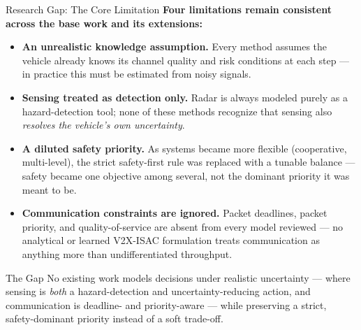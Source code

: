 \documentclass[aspectratio=169]{beamer}
\begin{document}
\begin{frame}{Research Gap: The Core Limitation}
  \footnotesize
  \textbf{Four limitations remain consistent across the base work and its extensions:}

  \begin{itemize}
    \setlength{\itemsep}{0pt}
    \item \textbf{An unrealistic knowledge assumption.} Every method assumes the vehicle already knows its channel quality and risk conditions at each step --- in practice this must be estimated from noisy signals.
    \item \textbf{Sensing treated as detection only.} Radar is always modeled purely as a hazard-detection tool; none of these methods recognize that sensing also \emph{resolves the vehicle's own uncertainty}.
    \item \textbf{A diluted safety priority.} As systems became more flexible (cooperative, multi-level), the strict safety-first rule was replaced with a tunable balance --- safety became one objective among several, not the dominant priority it was meant to be.
    \item \textbf{Communication constraints are ignored.} Packet deadlines, packet priority, and quality-of-service are absent from every model reviewed --- no analytical or learned V2X-ISAC formulation treats communication as anything more than undifferentiated throughput.
  \end{itemize}

  \scriptsize
  \begin{block}{The Gap}
    \centering No existing work models decisions under realistic uncertainty --- where sensing is \emph{both} a hazard-detection and uncertainty-reducing action, and communication is deadline- and priority-aware --- while preserving a strict, safety-dominant priority instead of a soft trade-off.
  \end{block}
\end{frame}
\end{document}
